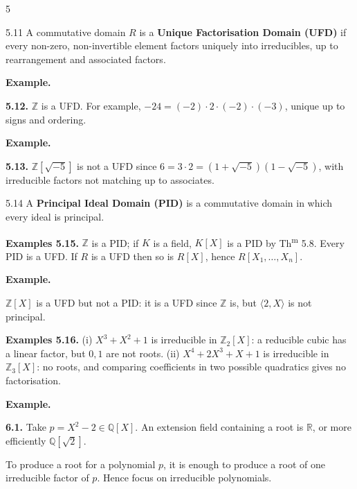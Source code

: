 \documentclass[8pt]{extarticle}
\newenvironment{example}{%
  \par\noindent
  \textbf{Example.}\ \normalfont
  \ignorespaces
}{%
  \par
}
\begin{document}
\begin{multicols*}{5}
        \begin{definition}{5.11}
            A commutative domain \(R\) is a \textbf{Unique Factorisation Domain (UFD)} if every non-zero, non-invertible element factors uniquely into irreducibles, up to rearrangement and associated factors.
        \end{definition}

        \begin{example}
            \textbf{5.12.} \(\mathbb{Z}\) is a UFD. For example, \(-24=(-2)\cdot2\cdot(-2)\cdot(-3)\), unique up to signs and ordering.
        \end{example}

        \begin{example}
            \textbf{5.13.} \(\mathbb{Z}[\sqrt{-5}]\) is not a UFD since \(6=3\cdot2=(1+\sqrt{-5})(1-\sqrt{-5})\), with irreducible factors not matching up to associates.
        \end{example}

        \begin{definition}{5.14}
            A \textbf{Principal Ideal Domain (PID)} is a commutative domain in which every ideal is principal.
        \end{definition}

        \textbf{Examples 5.15.}
        \(\mathbb{Z}\) is a PID; if \(K\) is a field, \(K[X]\) is a PID by Th\textsuperscript{m} 5.8. Every PID is a UFD. If \(R\) is a UFD then so is \(R[X]\), hence \(R[X_1,\ldots,X_n]\).

        \begin{example}
            \(\mathbb{Z}[X]\) is a UFD but not a PID: it is a UFD since \(\mathbb{Z}\) is, but \(\langle2,X\rangle\) is not principal.
        \end{example}

        \textbf{Examples 5.16.}
        (i) \(X^3+X^2+1\) is irreducible in \(\mathbb{Z}_2[X]\): a reducible cubic has a linear factor, but \(0,1\) are not roots. (ii) \(X^4+2X^3+X+1\) is irreducible in \(\mathbb{Z}_3[X]\): no roots, and comparing coefficients in two possible quadratics gives no factorisation.

        \begin{example}
            \textbf{6.1.} Take \(p=X^2-2\in\mathbb{Q}[X]\). An extension field containing a root is \(\mathbb{R}\), or more efficiently \(\mathbb{Q}[\sqrt2]\).
        \end{example}

        {\footnotesize To produce a root for a polynomial \(p\), it is enough to produce a root of one irreducible factor of \(p\). Hence focus on irreducible polynomials.}


\end{multicols*}
\end{document}

